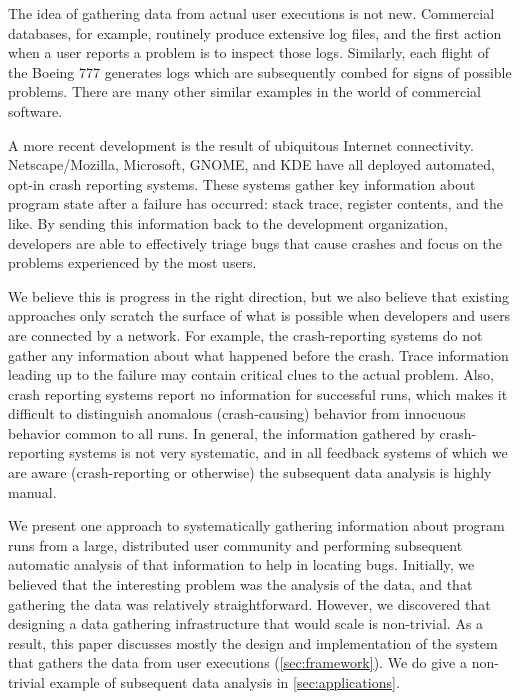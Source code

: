 The idea of gathering data from actual user executions is not new.
Commercial databases, for example, routinely produce extensive log
files, and the first action when a user reports a problem is to
inspect those logs.  Similarly, each flight of the Boeing 777
generates logs which are subsequently combed for signs of possible
problems.  There are many other similar examples in the world of
commercial software.

A more recent development is the result of ubiquitous Internet
connectivity.  Netscape/Mozilla, Microsoft, GNOME, and KDE have all
deployed automated, opt-in crash reporting systems.  These systems
gather key information about program state after a failure has
occurred: stack trace, register contents, and the like.  By sending
this information back to the development organization, developers are
able to effectively triage bugs that cause crashes and focus on the
problems experienced by the most users.

We believe this is progress in the right direction, but we also
believe that existing approaches only scratch the surface of what is
possible when developers and users are connected by a network.  For
example, the crash-reporting systems do not gather any information
about what happened before the crash.  Trace information leading up to
the failure may contain critical clues to the actual problem.  Also,
crash reporting systems report no information for successful runs,
which makes it difficult to distinguish anomalous (crash-causing)
behavior from innocuous behavior common to all runs.  In general, the
information gathered by crash-reporting systems is not very
systematic, and in all feedback systems of which we are aware
(crash-reporting or otherwise) the subsequent data analysis is highly
manual.

We present one approach to systematically gathering information about
program runs from a large, distributed user community and performing
subsequent automatic analysis of that information to help in locating
bugs.  Initially, we believed that the interesting problem was the
analysis of the data, and that gathering the data was relatively
straightforward.  However, we discovered that designing a data
gathering infrastructure that would scale is non-trivial.  As a
result, this paper discusses mostly the design and implementation of
the system that gathers the data from user executions
(\autoref{sec:framework}). We do give a non-trivial example of
subsequent data analysis in \autoref{sec:applications}.


